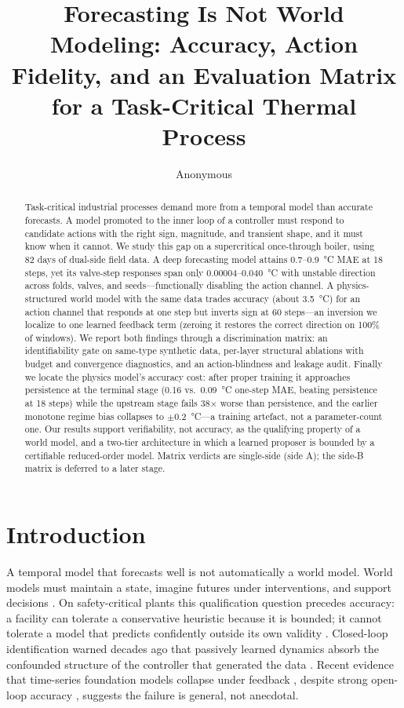 \documentclass{article}
\title{Forecasting Is Not World Modeling: Accuracy, Action Fidelity, and an Evaluation Matrix for a Task-Critical Thermal Process}
\author{Anonymous}
\begin{document}
\maketitle

\begin{abstract}
Task-critical industrial processes demand more from a temporal model than accurate
forecasts. A model promoted to the inner loop of a controller must respond to candidate
actions with the right sign, magnitude, and transient shape, and it must know when it
cannot. We study this gap on a supercritical once-through boiler, using 82 days of
dual-side field data. A deep forecasting model attains 0.7--0.9~\si{\degreeCelsius} MAE at
18 steps, yet its valve-step responses span only 0.00004--0.040~\si{\degreeCelsius} with
unstable direction across folds, valves, and seeds---functionally disabling the action
channel. A physics-structured world model with
the same data trades accuracy (about 3.5~\si{\degreeCelsius}) for an action channel
that responds at one step but inverts sign at 60 steps---an inversion we
localize to one learned feedback term (zeroing it restores the correct direction on
100\% of windows). We report both findings through a discrimination
matrix:
an identifiability gate on same-type synthetic data, per-layer structural ablations with
budget and convergence diagnostics, and an action-blindness and leakage
audit. Finally we locate the physics model's accuracy cost: after proper training it
approaches persistence at the terminal stage (0.16 vs.\ 0.09~\si{\degreeCelsius}
one-step MAE, beating persistence at 18 steps) while the upstream stage fails
38$\times$ worse than persistence, and the earlier monotone regime bias collapses to
$\pm$0.2~\si{\degreeCelsius}---a training artefact, not a parameter-count one. Our
results support verifiability, not accuracy, as the qualifying property of a world
model, and a two-tier architecture in which a learned proposer is bounded by a
certifiable reduced-order model. Matrix verdicts are single-side (side A); the side-B
matrix is deferred to a later stage.
\end{abstract}

\section{Introduction}

A temporal model that forecasts well is not automatically a world model. World models
must maintain a state, imagine futures under interventions, and support decisions
\cite{ha2018world, hafner2023dreamerv3, ding2024understanding}. On safety-critical
plants this qualification question precedes accuracy: a facility can tolerate a
conservative heuristic because it is bounded; it cannot tolerate a model that predicts
confidently outside its own validity \cite{ghosh2026rom}. Closed-loop identification
warned decades ago that passively learned dynamics absorb the confounded structure of
the controller that generated the data \cite{forssell1999closedloop}. Recent evidence
that time-series foundation models collapse under feedback \cite{wan2026forecast},
despite strong open-loop accuracy \cite{ansari2024chronos, das2024timesfm}, suggests
the failure is general, not anecdotal.
\end{document}
